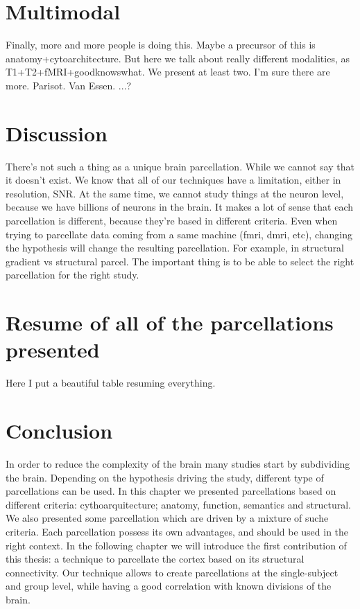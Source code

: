 \section{Multimodal}
Finally, more and more people is doing this. Maybe a precursor of this is
anatomy+cytoarchitecture. But here we talk about really different modalities,
as T1+T2+fMRI+goodknowswhat. We present at least two. I'm sure there are more.
Parisot.
Van Essen.
...?

\section{Discussion}
There's not such a thing as a unique brain parcellation. While we cannot say
that it doesn't exist. We know that all of our techniques have a limitation,
either in resolution, SNR. At the same time, we cannot study things at the
neuron level, because we have billions of neurons in the brain. It makes a
lot of sense that each parcellation is different, because they're based
in different criteria. Even when trying to parcellate data coming from a
same machine (fmri, dmri, etc), changing the hypothesis will change the 
resulting parcellation. For example, in structural gradient vs structural
parcel. The important thing is to be able to select the right parcellation
for the right study.

\section{Resume of all of the parcellations presented}
Here I put a beautiful table resuming everything.

\section{Conclusion}
In order to reduce the complexity of the brain many studies start by subdividing
the brain. Depending on the hypothesis driving the study, different type
of parcellations can be used. In this chapter we presented parcellations based
on different criteria: cythoarquitecture; anatomy, function, semantics and
structural. We also presented some parcellation which are driven by a mixture
of suche criteria. Each parcellation possess its own advantages, and should be
used in the right context. In the following chapter we will introduce the
first contribution of this thesis: a technique to parcellate the cortex based
on its structural connectivity. Our technique allows to create parcellations
at the single-subject and group level, while having a good correlation with
known divisions of the brain.


\chapterbib
